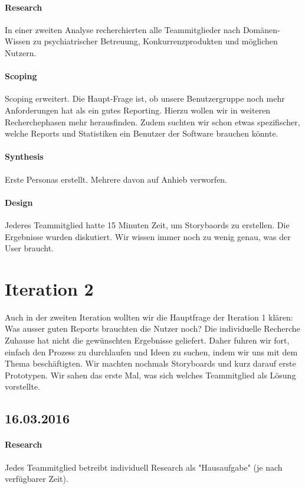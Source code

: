 \documentclass[a4paper]{scrreprt}
\begin{document}
\paragraph{Research}
In einer zweiten Analyse recherchierten alle Teammitglieder nach Domänen-Wissen zu psychiatrischer Betreuung, Konkurrenzprodukten und möglichen Nutzern.


\paragraph{Scoping}
Scoping erweitert. Die Haupt-Frage ist, ob unsere Benutzergruppe noch mehr Anforderungen hat als ein gutes Reporting. Hierzu wollen wir in weiteren Recherchephasen mehr herausfinden. Zudem suchten wir schon etwas spezifischer, welche Reports und Statistiken ein Benutzer der Software brauchen könnte.


\paragraph{Synthesis}
Erste Personas erstellt. Mehrere davon auf Anhieb verworfen.


\paragraph{Design}
Jederes Teammitglied hatte 15 Minuten Zeit, um Storybaords zu erstellen. Die Ergebnisse wurden diskutiert. Wir wissen immer noch zu wenig genau, was der User braucht.


\section{Iteration 2}
Auch in der zweiten Iteration wollten wir die Hauptfrage der Iteration 1 klären: Was ausser guten Reports brauchten die Nutzer noch? Die individuelle Recherche Zuhause hat nicht die gewünschten Ergebnisse geliefert. Daher fuhren wir fort, einfach den Prozess zu durchlaufen und Ideen zu suchen, indem wir uns mit dem Thema beschäftigten. Wir machten nochmals Storyboards und kurz darauf erste Prototypen. Wir sahen das erste Mal, was sich welches Teammitglied als Lösung vorstellte.

\subsection*{16.03.2016}
\paragraph{Research}
Jedes Teammitglied betreibt individuell Research als "Hausaufgabe" (je nach verfügbarer Zeit).
\end{document}
